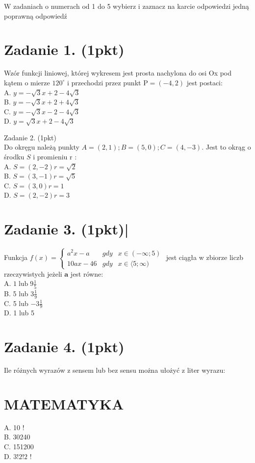 \documentclass[10pt]{article}
\begin{document}
W zadaniach o numerach od 1 do 5 wybierz i zaznacz na karcie odpowiedzi jedną poprawną odpowiedź

\section*{Zadanie 1. (1pkt)}
Wzór funkcji liniowej, której wykresem jest prosta nachylona do osi Ox pod kątem o mierze \(120^{\circ}\) i przechodzi przez punkt \(\mathrm{P}=(-4,2)\) jest postaci:\\
A. \(y=-\sqrt{3} x+2-4 \sqrt{3}\)\\
B. \(y=-\sqrt{3} x+2+4 \sqrt{3}\)\\
C. \(y=-\sqrt{3} x-2-4 \sqrt{3}\)\\
D. \(y=\sqrt{3} x+2-4 \sqrt{3}\)

Zadanie 2. (1pkt)\\
Do okręgu należą punkty \(A=(2,1) ; B=(5,0) ; C=(4,-3)\). Jest to okrąg o środku \(S\) i promieniu r :\\
A. \(S=(2,-2) r=\sqrt{2}\)\\
B. \(S=(3,-1) r=\sqrt{5}\)\\
C. \(S=(3,0) r=1\)\\
D. \(S=(2,-2) r=3\)

\section*{Zadanie 3. (1pkt)|}
Funkcja \(f(x)=\left\{\begin{array}{lll}a^{2} x-a & g d y & x \in(-\infty ; 5) \\ 10 a x-46 & g d y & x \in\langle 5 ; \infty)\end{array}\right.\) jest ciągła w zbiorze liczb rzeczywistych jeżeli \(\boldsymbol{a}\) jest równe:\\
A. \(1 \operatorname{lub} 9 \frac{1}{5}\)\\
B. 5 lub \(3 \frac{1}{9}\)\\
C. 5 lub \(-3 \frac{1}{9}\)\\
D. 1 lub 5

\section*{Zadanie 4. (1pkt)}
Ile różnych wyrazów z sensem lub bez sensu można ułożyć z liter wyrazu:

\section*{MATEMATYKA}
A. 10 !\\
B. 30240\\
C. 151200\\
D. \(3!2!2\) !
\end{document}
